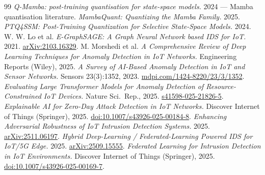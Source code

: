 \documentclass[11pt,a4paper]{article}
\begin{document}
\begin{thebibliography}{99}
 \emph{Q-Mamba: post-training quantisation for state-space models.} 2024 --- Mamba quantisation literature.
 \emph{MambaQuant: Quantizing the Mamba Family.} 2025.
 \emph{PTQ4SSM: Post-Training Quantization for Selective State-Space Models.} 2024.
 W. W. Lo et al. \emph{E-GraphSAGE: A Graph Neural Network based IDS for IoT.} 2021. \href{https://arxiv.org/abs/2103.16329}{arXiv:2103.16329}.
 M. Morshedi et al. \emph{A Comprehensive Review of Deep Learning Techniques for Anomaly Detection in IoT Networks.} Engineering Reports (Wiley), 2025.
 \emph{A Survey of AI-Based Anomaly Detection in IoT and Sensor Networks.} Sensors 23(3):1352, 2023. \href{https://www.mdpi.com/1424-8220/23/3/1352}{mdpi.com/1424-8220/23/3/1352}.
 \emph{Evaluating Large Transformer Models for Anomaly Detection of Resource-Constrained IoT Devices.} Nature Sci.\ Rep., 2025. \href{https://www.nature.com/articles/s41598-025-21826-5}{s41598-025-21826-5}.
 \emph{Explainable AI for Zero-Day Attack Detection in IoT Networks.} Discover Internet of Things (Springer), 2025. \href{https://link.springer.com/article/10.1007/s43926-025-00184-8}{doi:10.1007/s43926-025-00184-8}.
 \emph{Enhancing Adversarial Robustness of IoT Intrusion Detection Systems.} 2025. \href{https://arxiv.org/abs/2511.06197}{arXiv:2511.06197}.
 \emph{Hybrid Deep-Learning / Federated-Learning Powered IDS for IoT/5G Edge.} 2025. \href{https://arxiv.org/abs/2509.15555}{arXiv:2509.15555}.
 \emph{Federated Learning for Intrusion Detection in IoT Environments.} Discover Internet of Things (Springer), 2025. \href{https://link.springer.com/article/10.1007/s43926-025-00169-7}{doi:10.1007/s43926-025-00169-7}.
\end{thebibliography}
\end{document}
